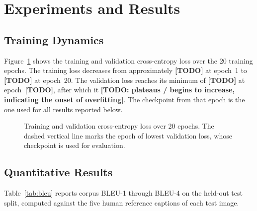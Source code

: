 \documentclass{article}
\begin{document}
\section{Experiments and Results}


\subsection{Training Dynamics}

Figure~\ref{fig:loss} shows the training and validation cross-entropy loss over
the 20 training epochs. The training loss decreases from approximately
\textbf{[TODO]} at epoch~1 to \textbf{[TODO]} at epoch~20. The validation loss
reaches its minimum of \textbf{[TODO]} at epoch~\textbf{[TODO]}, after which it
\textbf{[TODO: plateaus / begins to increase, indicating the onset of
overfitting]}. The checkpoint from that epoch is the one used for all results
reported below.

\begin{figure}[h]
  \centering
  \caption{Training and validation cross-entropy loss over 20 epochs. The
           dashed vertical line marks the epoch of lowest validation loss, whose
           checkpoint is used for evaluation.}
  \label{fig:loss}
\end{figure}

\subsection{Quantitative Results}

Table~\ref{tab:bleu} reports corpus BLEU-1 through BLEU-4 on the held-out test
split, computed against the five human reference captions of each test image.
\end{document}
